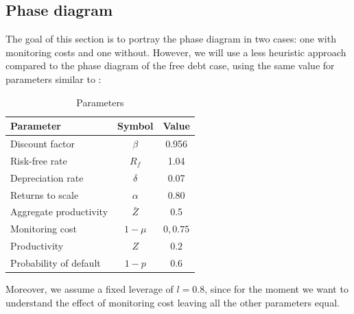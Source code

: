 \documentclass[12pt]{report}
\begin{document}
\subsection{Phase diagram}
The goal of this section is to portray the phase diagram in two cases: one with monitoring costs and one without.
However, we will use a less heuristic approach compared to the phase diagram of the free debt case, using the same value
for parameters similar to \cite{OsePap17}:
\begin{table}[H]
    \centering
    \begin{tabular}{lcc}
    \hline Parameter & Symbol & Value \\
    \hline \hline
    Discount factor & $\beta$ & 0.956 \\
    Risk-free rate & $R_f$ & 1.04 \\
    Depreciation rate & $\delta$ & 0.07 \\
    Returns to scale & $\alpha$ & 0.80 \\
    Aggregate productivity & $\bar{Z}$ & 0.5 \\
    Monitoring cost & $1-\mu$ & ${0,0.75}$ \\
    Productivity &$Z$&$0.2$\\
    Probability of default & $1-p $&0.6 \\
    \hline
    \end{tabular}
    \caption{Parameters}
\end{table}
Moreover, we assume a fixed leverage of \(l=0.8\), since for the moment we want to understand the effect of monitoring
cost leaving all the other parameters equal.
\end{document}
